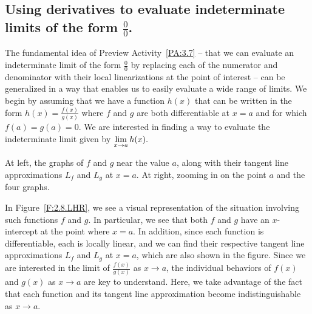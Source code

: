 
\subsection*{Using derivatives to evaluate indeterminate limits of the form $\frac{0}{0}$.}

The fundamental idea of Preview Activity~\ref{PA:3.7} -- that we can evaluate an indeterminate limit of the form $\frac{0}{0}$ by replacing each of the numerator and denominator with their local linearizations at the point of interest -- can be generalized in a way that enables us to easily evaluate a wide range of limits.  We begin by assuming that we have a function $h(x)$ that can be written in the form $h(x) = \frac{f(x)}{g(x)}$ where $f$ and $g$ are both differentiable at $x=a$ and for which $f(a) = g(a) = 0$.  We are interested in finding a way to evaluate the indeterminate limit given by
$\displaystyle \lim_{x \to a} h(x).$

\begin{marginfigure} %
\caption{At left, the graphs of $f$ and $g$ near the value $a$, along with their tangent line approximations $L_f$ and $L_g$ at $x = a$.  At right, zooming in on the point $a$ and the four graphs.} \label{F:2.8.LHR}
\end{marginfigure}

In Figure~\ref{F:2.8.LHR}, we see a visual representation of the situation involving such functions $f$ and $g$.  In particular, we see that both $f$ and $g$ have an $x$-intercept at the point where $x = a$.  In addition, since each function is differentiable, each is locally linear, and we can find their respective tangent line approximations $L_f$ and $L_g$ at $x = a$, which are also shown in the figure.  Since we are interested in the limit of $\frac{f(x)}{g(x)}$ as $x \to a$, the individual behaviors of $f(x)$ and $g(x)$ as $x \to a$ are key to understand.  Here, we take advantage of the fact that each function and its tangent line approximation become indistinguishable as $x \to a$.

